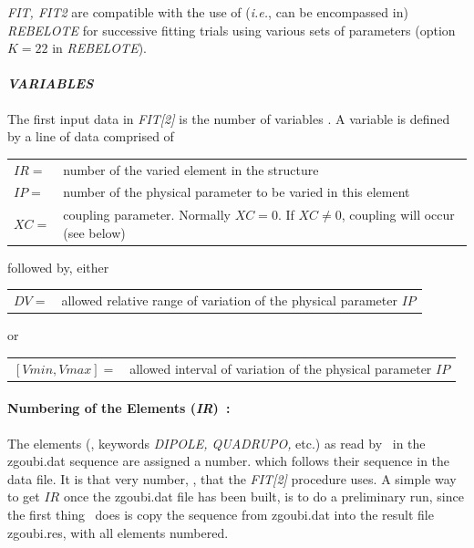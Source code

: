 \medskip

\noindent \textsl{FIT, FIT2}  are compatible with the use of (\emph{i.e.}, can be encompassed in)  
\textsl{REBELOTE}  for successive fitting  
trials using various sets of parameters (option $K=22$ in \textsl{REBELOTE}). 


\paragraph{\textit{VARIABLES}}

\noindent The first input data in \textsl{FIT[2]} is the number of variables
\textsl{\NV}. A variable is defined by a line of data comprised of 

\smallskip

\begin{tabular}{ll}
$ IR = $ &number of the varied element in the structure \\
$ IP =  $ &number of the physical parameter to be varied in this element \\
$ XC =  $ &coupling parameter. Normally $ XC=0$.  If $ XC\not= 0$, coupling will occur (see below) \\
\end{tabular} 

\noindent followed by, either 

\begin{tabular}{ll}
$ DV = $ &allowed relative range of variation of the physical parameter $ IP $
\end{tabular}

\noindent or 

\begin{tabular}{ll}
$ [Vmin,Vmax] = $ &allowed interval of variation of the physical parameter $ IP $
\end{tabular}



\paragraph{Numbering of the Elements (\textsl{IR})~: } 

\noindent The elements (\ie, keywords \textsl{DIPOLE, QUADRUPO,} etc.) 
as read by \zgoubi\ in the zgoubi.dat sequence are assigned a number.  which follows 
 their sequence in the  data file.  It  is that very number, \IR, that 
the \textsl{FIT[2]} procedure uses. 
A simple way to get $ IR $ once the zgoubi.dat file has been built, is to do a preliminary run, 
since the first thing  \zgou\ does is 
copy the sequence from zgoubi.dat  into the result file  zgoubi.res,  with all elements numbered.  

